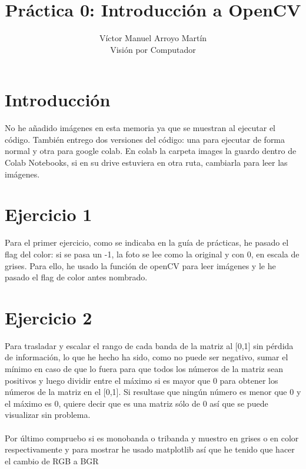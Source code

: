 \documentclass[12pt]{article}
\date{}
\begin{document}
 
\title{Práctica 0: Introducción a OpenCV}
\author{Víctor Manuel Arroyo Martín\\ %
Visión por Computador}

\maketitle
\section*{Introducción}
No he añadido imágenes en esta memoria ya que se muestran al ejecutar el código. También entrego dos versiones del código: una para ejecutar de forma normal y otra para google colab. En colab la carpeta images la guardo dentro de Colab Notebooks, si en su drive estuviera en otra ruta, cambiarla para leer las imágenes.

\section*{Ejercicio 1}
Para el primer ejercicio, como se indicaba en la guía de prácticas, he pasado el flag del color: si se pasa un -1, la foto se lee como la original y con 0, en escala de grises.
Para ello, he usado la función de openCV para leer imágenes y le he pasado el flag de color antes nombrado.

\section*{Ejercicio 2}
Para trasladar y escalar el rango de cada banda de la matriz al [0,1] sin pérdida de información, lo que he hecho ha sido, como no puede ser negativo, sumar el mínimo en caso de que lo fuera para que todos los números de la matriz sean positivos y luego dividir entre el máximo si es mayor que 0 para obtener los números de la matriz en el [0,1]. Si resultase que ningún número es menor que 0 y el máximo es 0, quiere decir que es una matriz sólo de 0 así que se puede visualizar sin problema.\\\\

Por último compruebo si es monobanda o tribanda y muestro en grises o en color respectivamente y para mostrar he usado matplotlib así que he tenido que hacer el cambio de RGB a BGR
\end{document}
